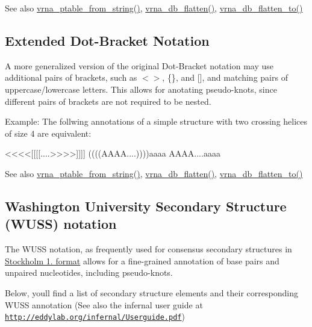 \begin{DoxySeeAlso}{See also}
\hyperlink{group__struct__utils_gac76c9ef3de507748fb0416a59323362b}{vrna\+\_\+ptable\+\_\+from\+\_\+string()}, \hyperlink{group__struct__utils_gae966b9f44168a4f4b39ca42ffb5f37b7}{vrna\+\_\+db\+\_\+flatten()}, \hyperlink{group__struct__utils_ga690425199c8b71545e7196e3af1436f8}{vrna\+\_\+db\+\_\+flatten\+\_\+to()}
\end{DoxySeeAlso}
\hypertarget{rna_structure_notations_dot-bracket-ext-notation}{}\subsection{Extended Dot-\/\+Bracket Notation}\label{rna_structure_notations_dot-bracket-ext-notation}
A more generalized version of the original Dot-\/\+Bracket notation may use additional pairs of brackets, such as {\ttfamily $<$$>$}, {\ttfamily \{\}}, and {\ttfamily \mbox{[}\mbox{]}}, and matching pairs of uppercase/lowercase letters. This allows for anotating pseudo-\/knots, since different pairs of brackets are not required to be nested.

Example\+: The follwing annotations of a simple structure with two crossing helices of size 4 are equivalent\+: \begin{DoxyVerb}<<<<[[[[....>>>>]]]]
((((AAAA....))))aaaa
AAAA{{{{....aaaa}}}}
\end{DoxyVerb}


\begin{DoxySeeAlso}{See also}
\hyperlink{group__struct__utils_gac76c9ef3de507748fb0416a59323362b}{vrna\+\_\+ptable\+\_\+from\+\_\+string()}, \hyperlink{group__struct__utils_gae966b9f44168a4f4b39ca42ffb5f37b7}{vrna\+\_\+db\+\_\+flatten()}, \hyperlink{group__struct__utils_ga690425199c8b71545e7196e3af1436f8}{vrna\+\_\+db\+\_\+flatten\+\_\+to()}
\end{DoxySeeAlso}
\hypertarget{rna_structure_notations_wuss-notation}{}\subsection{Washington University Secondary Structure (\+W\+U\+S\+S) notation}\label{rna_structure_notations_wuss-notation}
The W\+U\+SS notation, as frequently used for consensus secondary structures in \hyperlink{file_formats_msa-formats-stockholm}{Stockholm 1. format} allows for a fine-\/grained annotation of base pairs and unpaired nucleotides, including pseudo-\/knots.

Below, you\textquotesingle{}ll find a list of secondary structure elements and their corresponding W\+U\+SS annotation (See also the infernal user guide at \href{http://eddylab.org/infernal/Userguide.pdf}{\tt http\+://eddylab.\+org/infernal/\+Userguide.\+pdf})


